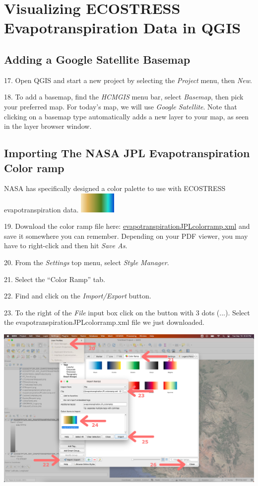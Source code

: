 \documentclass[oneside,a4paper,11pt,explicit]{book}
\begin{document}
\section{Visualizing ECOSTRESS Evapotranspiration Data in QGIS}

\subsection{Adding a Google Satellite Basemap}

17. Open QGIS and start a new project by selecting the \textit{Project} menu, then \textit{New}.

18. To add a basemap, find the \textit{HCMGIS} menu bar, select \textit{Basemap}, then pick your preferred map. For today's map, we will use \textit{Google Satellite}. Note that clicking on a basemap type automatically adds a new layer to your map, as seen in the layer browser window.

\subsection{Importing The NASA JPL Evapotranspiration Color ramp}

NASA has specifically designed a color palette to use with ECOSTRESS evapotranspiration data. \includegraphics[height= 1cm]{ETcolors.png} 

\vspace{.5em}

19. Download the color ramp file here: \href{https://jeremydforsythe.github.io/icecream-tutorials/Tutorial8_Evaportranspiration/evapotranspirationJPLcolorramp.xml}{evapotranspirationJPLcolorramp.xml} and save it somewhere you can remember. Depending on your PDF viewer, you may have to right-click and then hit \textit{Save As}.

20. From the \textit{Settings} top menu, select \textit{Style Manager}.

21. Select the ``Color Ramp'' tab.

22. Find and click on the \textit{Import/Export} button.

23. To the right of the \textit{File} input box click on the button with 3 dots (...). Select the evapotranspirationJPLcolorramp.xml file we just downloaded.

\centerline{\includegraphics[width=\textwidth]{ImportColorramp.png}} 
\end{document}

